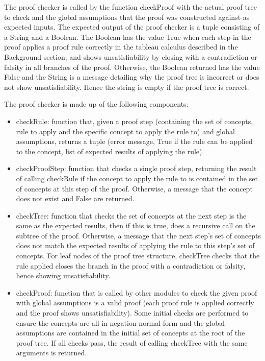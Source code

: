  The proof checker is called by the function checkProof with the actual proof tree to check and the global assumptions that the proof was constructed against as expected inputs. The expected output of the proof checker is a tuple consisting of a String and a Boolean. The Boolean has the value True when each step in the proof applies a proof rule correctly in the tableau calculus described in the Background section; and shows unsatisfiability by closing with a contradiction or falsity in all branches of the proof. Otherwise, the Boolean returned has the value False and the String is a message detailing why the proof tree is incorrect or does not show unsatisfiability. Hence the string is empty if the proof tree is correct.

 The proof checker is made up of the following components:

\begin{itemize}
\item checkRule: function that, given a proof step (containing the set of concepts, rule to apply and the specific concept to apply the rule to) and global assumptions, returns a tuple (error message, True if the rule can be applied to the concept, list of expected results of applying the rule).

\item checkProofStep: function that checks a single proof step, returning the result of calling checkRule if the concept to apply the rule to is contained in the set of concepts at this step of the proof. Otherwise, a message that the concept does not exist and False are returned.

\item checkTree: function that checks the set of concepts at the next step is the same as the expected results, then if this is true, does a recursive call on the subtree of the proof. Otherwise, a message that the next step's set of concepts does not match the expected results of applying the rule to this step's set of concepts. For leaf nodes of the proof tree structure, checkTree checks that the rule applied closes the branch in the proof with a contradiction or falsity, hence showing unsatisfiability.

\item checkProof: function that is called by other modules to check the given proof with global assumptions is a valid proof (each proof rule is applied correctly and the proof shows unsatisfiability). Some initial checks are performed to ensure the concepts are all in negation normal form and the global assumptions are contained in the initial set of concepts at the root of the proof tree. If all checks pass, the result of calling checkTree with the same arguments is returned.
\end{itemize}


